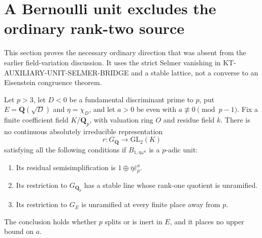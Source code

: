 \section{A Bernoulli unit excludes the ordinary rank-two source}
\label{sec:kt-ordinary-rank-two-unit}

This section proves the necessary ordinary direction
that was absent from the earlier field-variation
discussion.  It uses the strict Selmer vanishing in
KT-AUXILIARY-UNIT-SELMER-BRIDGE and a stable lattice,
not a converse to an Eisenstein congruence theorem.

\begin{theorem}
Let $p>3$, let $D<0$ be a fundamental discriminant
prime to $p$, put $E=\mathbf Q(\sqrt D)$ and
$\eta=\chi_D$, and let $a>0$ be even with
$a\not\equiv0\pmod{p-1}$.  Fix a finite coefficient
field $K/\mathbf Q_p$, with valuation ring $O$ and
residue field $k$.  There is no continuous
absolutely irreducible representation
\[
                 r:G_{\mathbf Q}\longrightarrow
                                  \mathrm{GL}_2(K)        \tag{OR.1}
\]
satisfying all the following conditions if
$B_{1,\eta\omega^a}$ is a $p$-adic unit:
\begin{enumerate}
\item Its residual semisimplification is
      $1\oplus\bar\eta\bar\varepsilon_p^a$.
\item Its restriction to $G_{\mathbf Q_p}$ has a
      stable line whose rank-one quotient is
      unramified.
\item Its restriction to $G_E$ is unramified at
      every finite place away from $p$.
\end{enumerate}
The conclusion holds whether $p$ splits or is inert
in $E$, and it places no upper bound on $a$.
\end{theorem}

